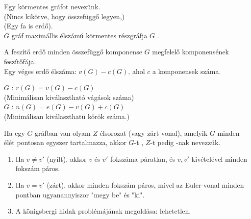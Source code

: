 \begin{frame}
\begin{tcolorbox}[title={Erdő, Feszítő erdő}]
Egy körmentes gráfot  nevezünk.\\
(Nincs kikötve, hogy összefüggő legyen,)\\
(Egy fa is erdő).\\
\mmedskip
$G$ gráf maximállis élszámú körmentes részgráfja $G$ .
\end{tcolorbox}

\begin{tcolorbox}[title={Ész}]
A feszítő erdő minden összefüggő komponense $G$ megfelelő komponensének feszítőfája.\\
\mmedskip
Egy véges erdő élszáma: $v(G) - c(G)$, ahol $c$ a komponensek száma.
\end{tcolorbox}

\begin{tcolorbox}[title={Rang, Nullitás}]
$G$ : $r(G) = v(G) - c(G)$\\
(Minimálisan kiválasztható vágások száma)\\
\mmedskip
$G$ : $n(G) = e(G) - v(G) + c(G)$\\
(Minimálisan kiválaszthatü körök száma.)
\end{tcolorbox}
\end{frame}

\begin{frame}
\begin{tcolorbox}[title={Def.: Euler gráfok}]
Ha egy $G$ gráfban van olyam $Z$ élsorozat (vagy zárt vonal), amelyik $G$ minden élét pontosan egyszer tartalmazza, akkor $G$-t , $Z$-t pedig -nak  nevezzük.
\end{tcolorbox}
\begin{tcolorbox}[title={Ész}]
\begin{enumerate}
\item Ha $v \neq v'$ (nyílt), akkor $v$ és $v'$ fokszáma páratlan, és $v, v'$ kivételével minden fokszám páros.
\item Ha $v = v'$ (zárt), akkor minden fokszám páros, mivel az Euler-vonal minden pontban ugyanannyiszor "megy be" és "ki".
\item A königsbergi hidak problémájának megoldása: lehetetlen.
\end{enumerate}
\end{tcolorbox}
\end{frame}


